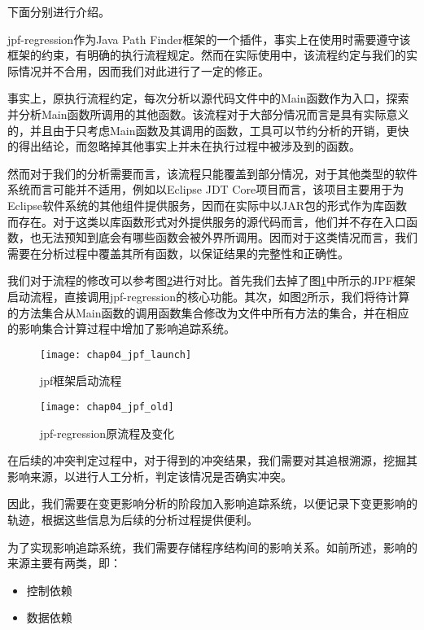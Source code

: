 下面分别进行介绍。


jpf-regression作为Java Path Finder框架的一个插件，事实上在使用时需要遵守该框架的约束，有明确的执行流程规定。然而在实际使用中，该流程约定与我们的实际情况并不合用，因而我们对此进行了一定的修正。

事实上，原执行流程约定，每次分析以源代码文件中的Main函数作为入口，探索并分析Main函数所调用的其他函数。该流程对于大部分情况而言是具有实际意义的，并且由于只考虑Main函数及其调用的函数，工具可以节约分析的开销，更快的得出结论，而忽略掉其他事实上并未在执行过程中被涉及到的函数。

然而对于我们的分析需要而言，该流程只能覆盖到部分情况，对于其他类型的软件系统而言可能并不适用，例如以Eclipse JDT Core项目而言，该项目主要用于为Eclipse软件系统的其他组件提供服务，因而在实际中以JAR包的形式作为库函数而存在。对于这类以库函数形式对外提供服务的源代码而言，他们并不存在入口函数，也无法预知到底会有哪些函数会被外界所调用。因而对于这类情况而言，我们需要在分析过程中覆盖其所有函数，以保证结果的完整性和正确性。

我们对于流程的修改可以参考图\ref {impact_process_old}进行对比。首先我们去掉了图\ref {impact_process}中所示的JPF框架启动流程，直接调用jpf-regression的核心功能。其次，如图\ref {impact_process_old}所示，我们将待计算的方法集合从Main函数的调用函数集合修改为文件中所有方法的集合，并在相应的影响集合计算过程中增加了影响追踪系统。

\begin{figure}[H]
	\centering
	\texttt{[image: chap04\_jpf\_launch]}
	\caption {jpf框架启动流程}
	\label {impact_process}	
\end{figure}


\begin{figure}
	\centering
	\texttt{[image: chap04\_jpf\_old]}
	\caption {jpf-regression原流程及变化}
	\label {impact_process_old}	
\end{figure}



在后续的冲突判定过程中，对于得到的冲突结果，我们需要对其追根溯源，挖掘其影响来源，以进行人工分析，判定该情况是否确实冲突。

因此，我们需要在变更影响分析的阶段加入影响追踪系统，以便记录下变更影响的轨迹，根据这些信息为后续的分析过程提供便利。

为了实现影响追踪系统，我们需要存储程序结构间的影响关系。如前所述，影响的来源主要有两类，即：
\begin{itemize}
	\item 控制依赖
	\item 数据依赖
\end{itemize}

